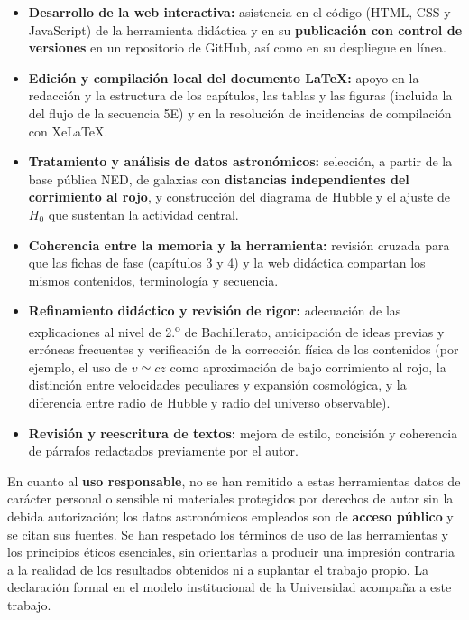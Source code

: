 \documentclass[10pt,a4paper]{report}
\begin{document}
\begin{itemize}
  \item \textbf{Desarrollo de la web interactiva:} asistencia en el código (HTML, CSS y JavaScript) de la herramienta didáctica y en su \textbf{publicación con control de versiones} en un repositorio de GitHub, así como en su despliegue en línea.
  \item \textbf{Edición y compilación local del documento \LaTeX:} apoyo en la redacción y la estructura de los capítulos, las tablas y las figuras (incluida la del flujo de la secuencia 5E) y en la resolución de incidencias de compilación con \mbox{XeLaTeX}.
  \item \textbf{Tratamiento y análisis de datos astronómicos:} selección, a partir de la base pública NED, de galaxias con \textbf{distancias independientes del corrimiento al rojo}, y construcción del diagrama de Hubble y el ajuste de $H_{0}$ que sustentan la actividad central.
  \item \textbf{Coherencia entre la memoria y la herramienta:} revisión cruzada para que las fichas de fase (capítulos 3 y 4) y la web didáctica compartan los mismos contenidos, terminología y secuencia.
  \item \textbf{Refinamiento didáctico y revisión de rigor:} adecuación de las explicaciones al nivel de 2.\textsuperscript{o} de Bachillerato, anticipación de ideas previas y erróneas frecuentes y verificación de la corrección física de los contenidos (por ejemplo, el uso de $v\simeq cz$ como aproximación de bajo corrimiento al rojo, la distinción entre velocidades peculiares y expansión cosmológica, y la diferencia entre radio de Hubble y radio del universo observable).
  \item \textbf{Revisión y reescritura de textos:} mejora de estilo, concisión y coherencia de párrafos redactados previamente por el autor.
\end{itemize}

En cuanto al \textbf{uso responsable}, no se han remitido a estas herramientas datos de carácter personal o sensible ni materiales protegidos por derechos de autor sin la debida autorización; los datos astronómicos empleados son de \textbf{acceso público} y se citan sus fuentes. Se han respetado los términos de uso de las herramientas y los principios éticos esenciales, sin orientarlas a producir una impresión contraria a la realidad de los resultados obtenidos ni a suplantar el trabajo propio. La declaración formal en el modelo institucional de la Universidad acompaña a este trabajo.







\appendix


\printbibliography[heading=bibintoc]
\end{document}
